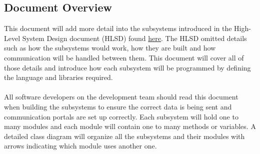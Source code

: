 \documentclass[11pt]{article}
\begin{document}
\subsection{Document Overview}
This document will add more detail into the subsystems introduced in the High-Level System Design document (HLSD) found \href{run:../Design.pdf}{here}. The HLSD omitted details such as how the subsystems would work, how they are built and how communication will be handled between them. This document will cover all of those details and introduce how each subsystem will be programmed by defining the language and libraries required. \\ \\
All software developers on the development team should read this document when building the subsystems to ensure the correct data is being sent and communication portals are set up correctly. Each subsystem will hold one to many modules and each module will contain one to many methods or variables. A detailed class diagram will organize all the subsystems and their modules with arrows indicating which module uses another one.
\end{document}
